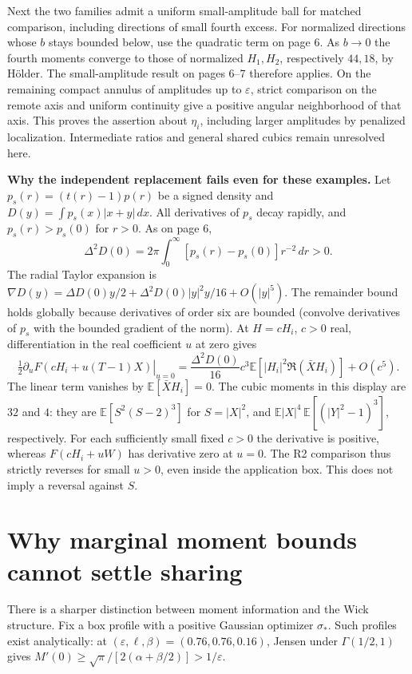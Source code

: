 \documentclass[11pt]{article}
\newcommand{\E}{\mathbb E}
\newcommand{\dd}{\,d}
\newcommand{\head}[1]{\section*{#1}}
\begin{document}
Next the two families admit a uniform small-amplitude ball for matched comparison,
including directions of small fourth excess. For normalized directions whose
\(b\) stays bounded below, use the quadratic term on page 6. As \(b\to0\) the
fourth moments converge to those of normalized \(H_1,H_2\), respectively \(44,18\),
by Hölder. The small-amplitude result on pages 6--7 therefore applies.
On the remaining compact annulus of amplitudes up to \(\varepsilon\), strict
comparison on the remote axis and uniform continuity give a positive angular
neighborhood of that axis. This proves the assertion about \(\eta_i\), including
larger amplitudes by penalized localization. Intermediate ratios and general
shared cubics remain unresolved here.

\textbf{Why the independent replacement fails even for these examples.}
Let \(p_s(r)=(t(r)-1)p(r)\) be a signed density and
\(D(y)=\int p_s(x)|x+y|\dd x\). All derivatives of \(p_s\) decay rapidly,
and \(p_s(r)>p_s(0)\) for \(r>0\). As on page 6,
\[
       \Delta^2D(0)=2\pi\int_0^\infty [p_s(r)-p_s(0)]r^{-2}\dd r>0 .
\]
The radial Taylor expansion is
\(\nabla D(y)=\Delta D(0)y/2+\Delta^2D(0)|y|^2y/16+O(|y|^5)\).
The remainder bound holds globally because derivatives of order six are bounded
(convolve derivatives of \(p_s\) with the bounded gradient of the norm).
At \(H=cH_i\), \(c>0\) real, differentiation in the real coefficient \(u\) at zero gives
\[
 \left.\tfrac12\partial_u F(cH_i+u(T-1)X)\right|_{u=0}
 =\frac{\Delta^2D(0)}{16}c^3\E[|H_i|^2\Re(\bar XH_i)]+O(c^5).
\]
The linear term vanishes by \(\E[\bar XH_i]=0\).
The cubic moments in this display are \(32\) and \(4\):
they are \(\E[S^2(S-2)^3]\) for \(S=|X|^2\), and
\(\E|X|^4\,\E[(|Y|^2-1)^3]\), respectively.
For each sufficiently small fixed \(c>0\) the derivative is positive, whereas
\(F(cH_i+uW)\) has derivative zero at \(u=0\). The R2 comparison thus strictly
reverses for small \(u>0\), even inside the application box. This does not imply
a reversal against \(S\).

\newpage
\head{Why marginal moment bounds cannot settle sharing}
There is a sharper distinction between moment information and the Wick structure.
Fix a box profile with a positive Gaussian optimizer \(\sigma_*\).
Such profiles exist analytically: at \((\varepsilon,\ell,\beta)=(0.76,0.76,0.16)\),
Jensen under \(\Gamma(1/2,1)\) gives
\(M'(0)\ge\sqrt\pi/[2(\alpha+\beta/2)]>1/\varepsilon\).
\end{document}
